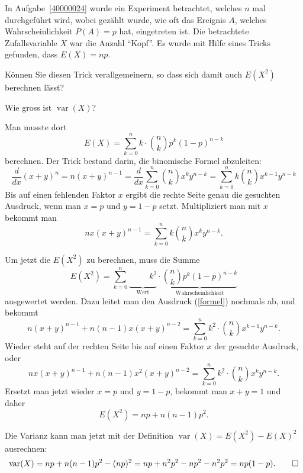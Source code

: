 In Aufgabe~\ref{40000024} wurde ein Experiment betrachtet, welches
$n$ mal durchgeführt wird, wobei gezählt wurde, wie oft das Ereignis
$A$, welches Wahrscheinlichkeit $P(A)=p$ hat, eingetreten ist. Die
betrachtete Zufallsvariable $X$ war die Anzahl ``Kopf''. Es wurde
mit Hilfe eines Tricks gefunden, dass $E(X)=np$.
\begin{teilaufgaben}
\item
Können Sie diesen Trick verallgemeinern, so dass sich damit auch $E(X^2)$
berechnen lässt?
\item Wie gross ist $\operatorname{var}(X)$?
\end{teilaufgaben}


\begin{loesung}
\begin{teilaufgaben}
\item
Man musste dort
\[
E(X)=\sum_{k=0}^nk\cdot \binom{n}{k}p^k(1-p)^{n-k}
\]
berechnen.
Der Trick bestand darin, die binomische Formel abzuleiten:
\[
\frac{d}{dx}(x+y)^n=n(x+y)^{n-1}
=\frac{d}{dx}\sum_{k=0}^n\binom{n}{k}x^ky^{n-k}
=\sum_{k=0}^nk\binom{n}{k}x^{k-1}y^{n-k}
\]
Bis auf einen fehlenden Faktor $x$ ergibt die rechte Seite genau
die gesuchten Ausdruck, wenn man $x=p$ und $y=1-p$ setzt. Multipliziert
man mit $x$ bekommt man
\begin{equation}
nx(x+y)^{n-1}
=
\sum_{k=0}^nk\binom{n}{k}x^ky^{n-k}.
\label{formel}
\end{equation}

Um jetzt die $E(X^2)$ zu berechnen, muss die Summe
\[
E(X^2)=\sum_{k=0}^n\underbrace{\phantom{\binom{n}{k}}k^2}_{\text{Wert}}\cdot\underbrace{\binom{n}{k}p^k(1-p)^{n-k}}_{\text{Wahrscheinlichkeit}}
\]
ausgewertet werden. Dazu leitet man den Ausdruck (\ref{formel}) nochmals
ab, und bekommt
\[
n(x+y)^{n-1}+n(n-1)x(x+y)^{n-2}
=
\sum_{k=0}^nk^2\cdot \binom{n}{k}x^{k-1}y^{n-k}.
\]
Wieder steht auf der rechten Seite bis auf einen Faktor $x$ der gesuchte
Ausdruck, oder
\[
nx(x+y)^{n-1}+n(n-1)x^2(x+y)^{n-2}
=
\sum_{k=0}^nk^2\cdot \binom{n}{k}x^{k}y^{n-k}.
\]
Ersetzt man jetzt wieder $x=p$ und $y=1-p$, bekommt man $x+y=1$ und daher
\[
E(X^2)=np+n(n-1)p^2.
\]
\item
Die Varianz kann man jetzt mit der Definition $\operatorname{var}(X)=E(X^2)-E(X)^2$ ausrechnen:
\[
\operatorname{var}(X)=np+n(n-1)p^2-(np)^2=np +n^2p^2-np^2-n^2p^2=np(1-p).
\qedhere
\]
\end{teilaufgaben}
\end{loesung}

